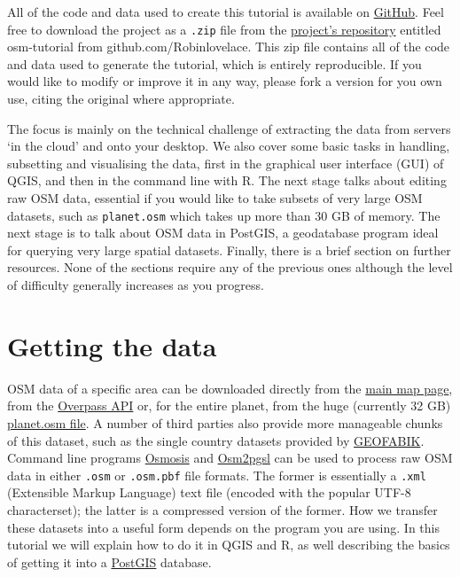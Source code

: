 \documentclass[]{article}
\begin{document}
All of the code and data used to create this tutorial is available on
\href{http://github.com}{GitHub}. Feel free to download the project as a
\texttt{.zip} file from the
\href{https://github.com/Robinlovelace/osm-tutorial}{project's
repository} entitled osm-tutorial from github.com/Robinlovelace. This
zip file contains all of the code and data used to generate the
tutorial, which is entirely reproducible. If you would like to modify or
improve it in any way, please fork a version for you own use, citing the
original where appropriate.

The focus is mainly on the technical challenge of extracting the data
from servers `in the cloud' and onto your desktop. We also cover some
basic tasks in handling, subsetting and visualising the data, first in
the graphical user interface (GUI) of QGIS, and then in the command line
with R. The next stage talks about editing raw OSM data, essential if
you would like to take subsets of very large OSM datasets, such as
\texttt{planet.osm} which takes up more than 30 GB of memory. The next
stage is to talk about OSM data in PostGIS, a geodatabase program ideal
for querying very large spatial datasets. Finally, there is a brief
section on further resources. None of the sections require any of the
previous ones although the level of difficulty generally increases as
you progress.

\section{Getting the data}

OSM data of a specific area can be downloaded directly from the
\href{http://www.openstreetmap.org}{main map page}, from the
\href{http://overpass-api.de/}{Overpass API} or, for the entire planet,
from the huge (currently 32 GB)
\href{http://planet.openstreetmap.org/}{planet.osm file}. A number of
third parties also provide more manageable chunks of this dataset, such
as the single country datasets provided by
\href{http://download.geofabrik.de/}{GEOFABIK}. Command line programs
\href{http://wiki.openstreetmap.org/wiki/Osmosis}{Osmosis} and
\href{http://wiki.openstreetmap.org/wiki/Osm2pgsql}{Osm2pgsl} can be
used to process raw OSM data in either \texttt{.osm} or
\texttt{.osm.pbf} file formats. The former is essentially a
\texttt{.xml} (Extensible Markup Language) text file (encoded with the
popular UTF-8 characterset); the latter is a compressed version of the
former. How we transfer these datasets into a useful form depends on the
program you are using. In this tutorial we will explain how to do it in
QGIS and R, as well describing the basics of getting it into a
\href{http://postgis.net/}{PostGIS} database.
\end{document}
